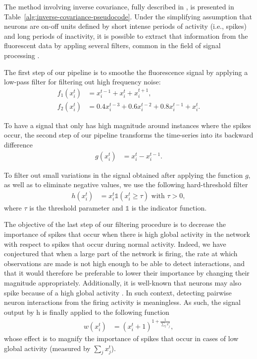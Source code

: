 \documentclass[wcp]{jmlr}
\begin{document}
The method involving inverse covariance, fully described in \cite{sutera2014simple}, is presented in Table~\ref{alg:inverse-covariance-pseudocode}. Under the simplifying assumption that neurons are on-off units defined by short intense periods of activity (i.e., spikes) and long periods of inactivity, it is possible to extract that information from the fluorescent data by appling several filters, common in the field of signal processing \citep{kaiser1977data, oppenheim1983signals}.

The first step of our pipeline is to smoothe the fluorescence signal by applying a low-pass filter for filtering out high frequency noise:
\begin{align}
f_1(x^t_i) &= x^{t-1}_i + x^t_i + x^{t+1}_i, \label{eq:symetric-median} \\
f_2(x^t_i) &= 0.4 x^{t-3}_i + 0.6 x^{t-2}_i + 0.8 x^{t-1}_i + x_i^t.
\label{eq:weighted-asymetric-median}
\end{align}

To have a signal that only has high magnitude around instances where the spikes occur, the second step of our pipeline transforms the time-series into its backward difference
\begin{align}
g(x^{t}_{i}) &= x^{t}_i - x^{t-1}_i. \label{eq:high-pass-filter}
\end{align}

To filter out small variations in the signal obtained after applying the function $g$, as well
as to eliminate negative values, we use the following hard-threshold filter
\begin{align}\label{eqn:hfilter}
h(x^{t}_i) &= x^{t}_i \mathbb{1}(x^{t}_i \geq \tau) \text{ with } \tau > 0,
\end{align}
where $\tau$ is the threshold parameter and $\mathbb{1}$ is the indicator function.


The objective of the last step of our filtering procedure is to decrease the importance of spikes that occur when there is high global activity in the network with respect to spikes that occur during normal activity. Indeed, we have conjectured that when a large part of the network is firing, the rate at which observations are made is not high enough to be able to detect interactions, and that it would therefore be preferable to lower their importance by changing their magnitude appropriately. Additionally, it is well-known that neurons may also spike because of a high global activity \citep{stetter2012model}. In such context, detecting pairwise neuron interactions from the firing activity is meaningless. As such, the signal output by h is finally applied to the following function
\begin{align}
 w(x^{t}_i) &= (x^{t}_i + 1 )^{1 + \frac{1}{\sum_{j} x^{t}_j}}, \label{eq:magnify-filter}
\end{align}
whose effect is to magnify the importance of spikes that occur in cases of low global activity (measured by $\sum_j x^t_j$).\\
\end{document}
